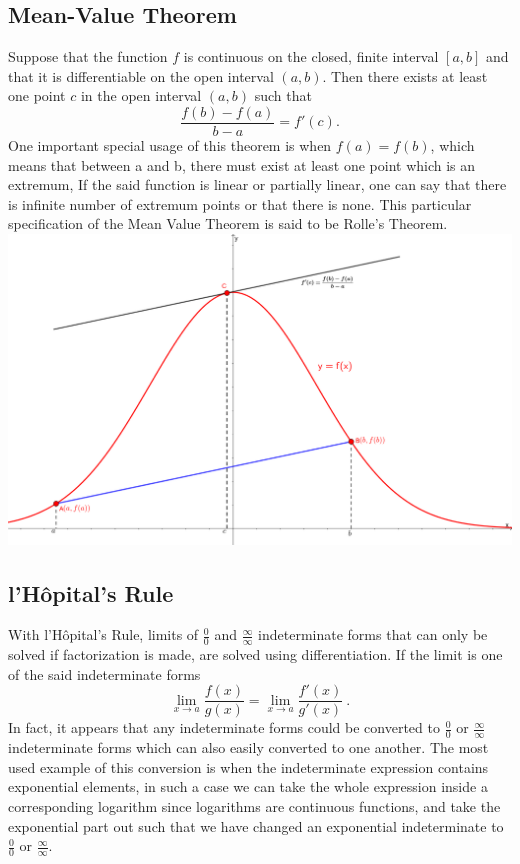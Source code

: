 \documentclass[12pt]{article}
\begin{document}
\subsection{Mean-Value Theorem}
Suppose that the function $f$ is continuous on the closed, finite interval $[a,b]$ and that
it is differentiable on the open interval $(a,b)$. Then there exists at least one point $c$ in the open interval $(a,b)$ such that $$\frac{f(b)-f(a)}{b-a}=f'(c) .$$ One important special usage of this theorem is when $f(a)=f(b)$, which means that between a and b, there must exist at least one point which is an extremum, If the said function is linear or partially linear, one can say that there is infinite number of extremum points or that there is none. This particular specification of the Mean Value Theorem is said to be Rolle's Theorem.\\
\includegraphics[scale=3.4]{MVT.png}
\subsection{l'Hôpital's Rule}
With l'Hôpital's Rule, limits of $\displaystyle{\frac{0}{0}}$ and $\displaystyle{\frac{\infty}{\infty}}$ indeterminate forms that can only be solved if factorization is made, are solved using differentiation. If the limit is one of the said indeterminate forms $$\lim \limits_{x \to a} \frac{f(x)}{g(x)}=\lim \limits_{x \to a} \frac{f'(x)}{g'(x)} \  .$$
In fact, it appears that any indeterminate forms could be converted to $\displaystyle{\frac{0}{0}}$ or $\displaystyle{\frac{\infty}{\infty}}$ indeterminate forms which can also easily converted to one another. The most used example of this conversion is when the indeterminate expression contains exponential elements, in such a case we can take the whole expression inside a corresponding logarithm since logarithms are continuous functions, and take the exponential part out such that we have changed an exponential indeterminate to $\displaystyle{\frac{0}{0}}$ or $\displaystyle{\frac{\infty}{\infty}}$.
\end{document}
